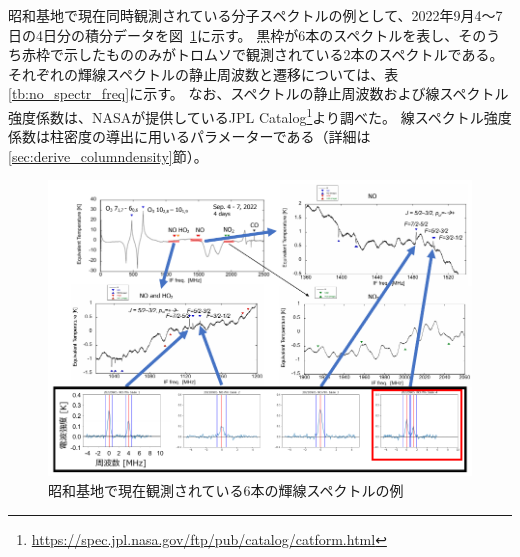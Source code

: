 昭和基地で現在同時観測されている分子スペクトルの例として、2022年9月4〜7日の4日分の積分データを図~\ref{fig:NO_spectr}に示す。
黒枠が6本のスペクトルを表し、そのうち赤枠で示したもののみがトロムソで観測されている2本のスペクトルである。
それぞれの輝線スペクトルの静止周波数と遷移については、表\ref{tb:no_spectr_freq}に示す。
なお、スペクトルの静止周波数および線スペクトル強度係数は、NASAが提供しているJPL Catalog\footnote{\url{https://spec.jpl.nasa.gov/ftp/pub/catalog/catform.html}}より調べた。
線スペクトル強度係数は柱密度の導出に用いるパラメーターである（詳細は\ref{sec:derive_columndensity}節）。
\begin{figure}[htbp]
    \centering
    \includegraphics[width=\linewidth]{master_thesis_contents/master_thesis_fig/NO_spectr.pdf}
    \caption{昭和基地で現在観測されている6本の輝線スペクトルの例}
    \label{fig:NO_spectr}
\end{figure}
